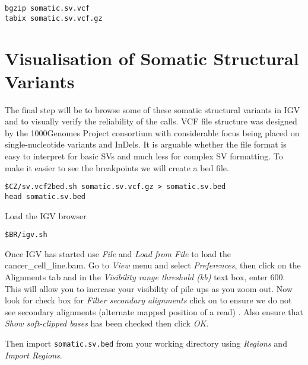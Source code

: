 \begin{steps}
\begin{lstlisting}
bgzip somatic.sv.vcf
tabix somatic.sv.vcf.gz
\end{lstlisting}
\end{steps}



\section{Visualisation of Somatic Structural Variants}

\begin{information}
The final step will be to browse some of these somatic structural variants in IGV and to visually verify the reliability of the calls. VCF file structure was designed by the 1000Genomes Project consortium with considerable focus being placed on single-nucleotide variants and InDels. It is arguable whether the file format is easy to interpret for basic SVs and much less for complex SV formatting. To make it easier to see the breakpoints we will create a bed file. 

\end{information}
\begin{steps}
\begin{lstlisting}
$CZ/sv.vcf2bed.sh somatic.sv.vcf.gz > somatic.sv.bed
head somatic.sv.bed
\end{lstlisting}
\end{steps}

\begin{steps}
Load the IGV browser 
\begin{lstlisting}
$BR/igv.sh
\end{lstlisting}
\end{steps}

\begin{information}
Once IGV has started use \emph{File} and \emph{Load from File} to load the cancer\_cell\_line.bam.  Go to \emph{View} menu and select \emph{Preferences}, then click on the Alignments tab and in the \emph{Visibility range threshold (kb)} text box, enter 600. This will allow you to increase your visibility of pile ups as you zoom out. Now look for check box for \emph{Filter secondary alignments} click on to ensure we do not see secondary alignments (alternate mapped position of a read) . Also ensure that \emph{Show soft-clipped bases} has been checked then click \emph{OK}.
 
Then import \texttt{somatic.sv.bed} from your working directory using \emph{Regions} and \emph{Import Regions}. 

\end{information}

